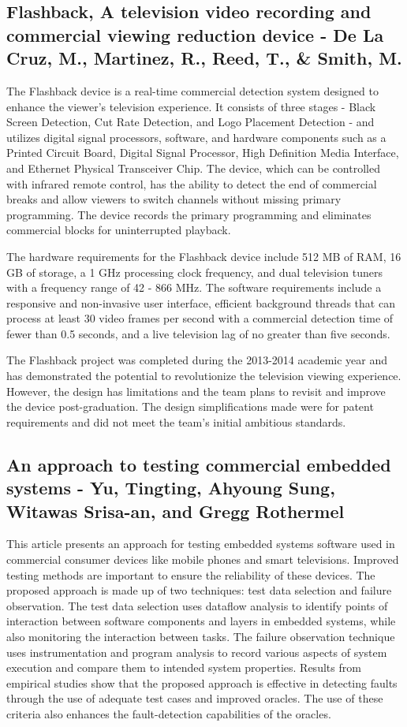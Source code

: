 \documentclass[12pt, twoside]{article}
\begin{document}
\subsection{Flashback, A television video recording and commercial viewing reduction device - De La Cruz, M., Martinez, R., Reed, T., \& Smith, M.}
The Flashback device is a real-time commercial detection system designed to enhance the viewer's television experience. It consists of three stages - Black Screen Detection, Cut Rate Detection, and Logo Placement Detection - and utilizes digital signal processors, software, and hardware components such as a Printed Circuit Board, Digital Signal Processor, High Definition Media Interface, and Ethernet Physical Transceiver Chip. The device, which can be controlled with infrared remote control, has the ability to detect the end of commercial breaks and allow viewers to switch channels without missing primary programming. The device records the primary programming and eliminates commercial blocks for uninterrupted playback.

The hardware requirements for the Flashback device include 512 MB of RAM, 16 GB of storage, a 1 GHz processing clock frequency, and dual television tuners with a frequency range of 42 - 866 MHz. The software requirements include a responsive and non-invasive user interface, efficient background threads that can process at least 30 video frames per second with a commercial detection time of fewer than 0.5 seconds, and a live television lag of no greater than five seconds.

The Flashback project was completed during the 2013-2014 academic year and has demonstrated the potential to revolutionize the television viewing experience. However, the design has limitations and the team plans to revisit and improve the device post-graduation. The design simplifications made were for patent requirements and did not meet the team's initial ambitious standards.


\subsection{An approach to testing commercial embedded systems - Yu, Tingting, Ahyoung Sung, Witawas Srisa-an, and Gregg Rothermel}
This article presents an approach for testing embedded systems software used in commercial consumer devices like mobile phones and smart televisions. Improved testing methods are important to ensure the reliability of these devices. The proposed approach is made up of two techniques: test data selection and failure observation. The test data selection uses dataflow analysis to identify points of interaction between software components and layers in embedded systems, while also monitoring the interaction between tasks. The failure observation technique uses instrumentation and program analysis to record various aspects of system execution and compare them to intended system properties. Results from empirical studies show that the proposed approach is effective in detecting faults through the use of adequate test cases and improved oracles. The use of these criteria also enhances the fault-detection capabilities of the oracles.
\end{document}
